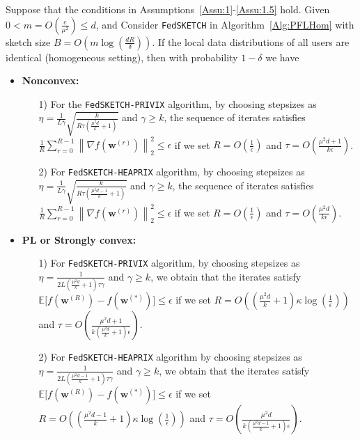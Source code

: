 \begin{theorem}\label{thm:homog_case}
  Suppose that the conditions in Assumptions~\ref{Assu:1}-\ref{Assu:1.5} hold. Given $0<m=O\left(\frac{e}{\mu^2}\right)\leq d$, and Consider \texttt{FedSKETCH} in Algorithm~\ref{Alg:PFLHom} with sketch size $B=O\left(m\log\left(\frac{d R}{\delta}\right)\right)$. If the local data distributions of all users are identical (homogeneous setting), then with probability $1-\delta$ we have  
 \begin{itemize}
     \item \textbf{Nonconvex:}  
     \begin{itemize}
         \item [1)] For the  \texttt{FedSKETCH-PRIVIX} algorithm, by choosing stepsizes as $\eta=\frac{1}{L\gamma}\sqrt{\frac{k}{R\tau\left(\frac{\mu^2d}{k}+1\right)}}$ and $\gamma\geq k$, the sequence of iterates satisfies  $\frac{1}{R}\sum_{r=0}^{R-1}\left\|\nabla f({\boldsymbol{w}}^{(r)})\right\|_2^2\leq {\epsilon}$ if we set
     $R=O\left(\frac{1}{\epsilon}\right)$ and $ \tau=O\left(\frac{\mu^2d+1}{{k}\epsilon}\right)$.
         \item[2)] For \texttt{FedSKETCH-HEAPRIX} algorithm, by choosing stepsizes as $\eta=\frac{1}{L\gamma}\sqrt{\frac{k}{R\tau\left(\frac{\mu^2d-1}{k}+1\right)}}$ and $\gamma\geq k$, the sequence of iterates satisfies  $\frac{1}{R}\sum_{r=0}^{R-1}\left\|\nabla f({\boldsymbol{w}}^{(r)})\right\|_2^2\leq {\epsilon}$ if we set
     $R=O\left(\frac{1}{\epsilon}\right)$ and $ \tau=O\left(\frac{\mu^2d}{{k}\epsilon}\right)$. 
     \end{itemize}
     
     \item \textbf{PL or Strongly convex:}
      \begin{itemize}
          \item[1)] For \texttt{FedSKETCH-PRIVIX} algorithm, by choosing stepsizes as $\eta=\frac{1}{2L\left(\frac{\mu^2d}{k}+1\right)\tau\gamma}$ and $\gamma\geq k$, we obtain that the iterates satisfy $\mathbb{E}\Big[f({\boldsymbol{w}}^{(R)})-f({\boldsymbol{w}}^{(*)})\Big]\leq \epsilon$ if  we set
     $R=O\left(\left(\frac{\mu^2d}{k}+1\right)\kappa\log\left(\frac{1}{\epsilon}\right)\right)$ and $ \tau=O\left(\frac{\mu^2d+1}{k\left(\frac{\mu^2d}{k}+1\right)\epsilon}\right)$.
          
          \item[2)] For \texttt{FedSKETCH-HEAPRIX} algorithm
by choosing stepsizes as $\eta=\frac{1}{2L\left(\frac{\mu^2d-1}{k}+1\right)\tau\gamma}$ and $\gamma\geq k$, we obtain that the iterates satisfy $\mathbb{E}\Big[f({\boldsymbol{w}}^{(R)})-f({\boldsymbol{w}}^{(*)})\Big]\leq \epsilon$ if  we set
     $R=O\left(\left(\frac{\mu^2d-1}{k}+1\right)\kappa\log\left(\frac{1}{\epsilon}\right)\right)$ and $ \tau=O\left(\frac{\mu^2d}{k\left(\frac{\mu^2d-1}{k}+1\right)\epsilon}\right)$. 
      \end{itemize}
      

\end{itemize}
\end{theorem}

